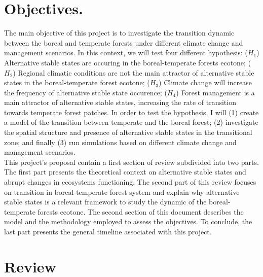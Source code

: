 

\section{Objectives.}


The main objective of this project is to investigate the transition dynamic
between the boreal and temperate forests under different climate change and
management scenarios. In this context, we will test four different hypothesis:
($H_1$) Alternative stable states are occuring in the boreal-temperate forests
ecotone; ($H_2$) Regional climatic conditions are not the main attractor of
alternative stable states in the boreal-temperate forest ecotone; ($H_3$)
Climate change will increase the frequency of alternative stable state
occurence; ($H_4$) Forest management is a main attractor of alternative stable
states, increasing the rate of transition towards temperate forest patches. In
order to test the hypothesis, I will (1) create a model of the transition
between temperate and the boreal forest; (2) investigate the spatial structure
and presence of alternative stable states in the transitional zone; and
finally (3) run simulations based on different climate change and management
scenarios.\\

This project's proposal contain a first section of review subdivided into two
parts. The first part presents the theoretical context on alternative stable
states and abrupt changes in ecosystems functioning. The second part of this
review focuses on transition in boreal-temperate forest system and explain why
alternative stable states is a relevant framework to study the dynamic of the
boreal-temperate forests ecotone.  The second section of this document
describes the model and the methodology employed to assess the objectives. To
conclude, the last part presents the general timeline associated with this
project.


\section{Review} 

